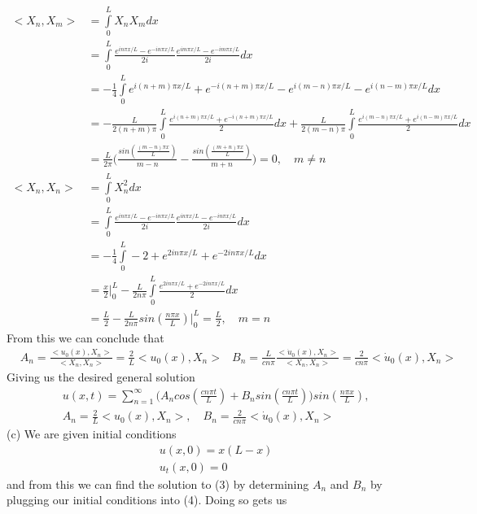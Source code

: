 \documentclass[10pt]{article}
\begin{document}
\begin{align*}
<X_n,X_m> & = \int\limits_0^L X_nX_m dx \\
& = \int\limits_0^L \frac{e^{in\pi x/ L} - e^{-in\pi x/ L}}{2i}\frac{e^{im\pi x/ L} - e^{-im\pi x/ L}}{2i} dx \\ 
& = -\frac{1}{4}\int\limits_0^L e^{i(n+m)\pi x / L} + e^{-i(n+m)\pi x / L} - e^{i(m-n)\pi x / L} - e^{i(n-m)\pi x / L} dx \\
& = -\frac{L}{2(n+m)\pi}\int\limits_0^L \frac{e^{i(n+m)\pi x / L} + e^{-i(n+m)\pi x / L}}{2}dx + \frac{L}{2(m-n)\pi}\int\limits_0^L \frac{e^{i(m-n)\pi x / L} + e^{i(n-m)\pi x / L}}{2}dx \\ 
& = \frac{L}{2\pi}\bigg(\frac{sin(\frac{(m-n)\pi x}{L})}{m-n} - \frac{sin(\frac{(m+n)\pi x}{L})}{m+n}\bigg) = 0, \quad m \neq n \\
<X_n, X_n> & = \int\limits_0^L X_n^2 dx \\ 
& = \int\limits_0^L \frac{e^{in\pi x/ L} - e^{-in\pi x/ L}}{2i}\frac{e^{in\pi x/ L} - e^{-in\pi x/ L}}{2i} dx \\ 
& = -\frac{1}{4}\int\limits_0^L -2 + e^{2in\pi x / L} + e^{-2in\pi x / L} dx \\ 
& = \frac{x}{2}\bigg\vert_0^L -\frac{L}{2n\pi}\int\limits_0^L \frac{e^{2in\pi x / L} + e^{-2in\pi x / L}}{2} dx \\ 
& = \frac{L}{2} -\frac{L}{2n\pi}sin(\frac{n\pi x}{L})\bigg\vert_0^L = \frac{L}{2}, \quad m = n
\end{align*}
From this we can conclude that 
\begin{align*}
& A_n = \frac{<u_0(x), X_n>}{<X_n, X_n>} = \frac{2}{L}<u_0(x),X_n> 
& B_n = \frac{L}{cn\pi}\frac{<\dot{u}_0(x), X_n>}{<X_n, X_n>} = \frac{2}{cn\pi}<\dot{u}_0(x), X_n>
\end{align*}
Giving us the desired general solution
\begin{align}
& u(x,t) = \sum\limits_{n=1}^\infty \bigg(A_ncos(\frac{cn\pi t}{L}) + B_nsin(\frac{cn\pi t}{L})\bigg)sin(\frac{n\pi x}{L}), \\
& A_n = \frac{2}{L}<u_0(x),X_n>, \quad B_n = \frac{2}{cn\pi}<\dot{u}_0(x), X_n>
\end{align}
\newline
(c) We are given initial conditions 
\begin{align*}
& u(x,0) = x(L-x) \\
& u_t(x,0) = 0
\end{align*}
and from this we can find the solution to (3) by determining $A_n$ and $B_n$ by plugging our initial conditions into (4). Doing so gets us
\end{document}
